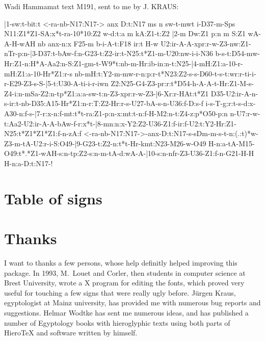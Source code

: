\documentclass[final]{article}
\begin{document}
Wadi Hammamat text M191, sent to me by J. KRAUS:
\begin{hieroglyph}
|1-sw:t-bit:t <-ra-nb-N17:N17-> anx D:t:N17 ms n sw-t-mwt i-D37-m-Sps N11:Z1*Z1-SA:x*t-ra-10*10:Z2 w-d:t:a m
kA:Z1-t:Z2 |2-m Dw:Z1 p:n m S:Z1 wA-A-H-wAH nb anx-n:x F25-m b-i-A-t:F18 ir:t H-w
U2:ir-A-A-xpr:r-w-Z3-nw:Z1-nTr-p:n-|3-D37:t-bAw-f:n-G23-t:Z2-ir:t-N25:t*Z1-m-U20:nw-i-i-N36
b-s-t:D54-mw-Hr:Z1-n:H*A-Aa2:n-S:Z1-gm-t-W9*t:nb-m-Hr:ib-in:n-t:N25-|4-mH:Z1:a-10-r-mH:Z1:a-10-Hr*Z1:r-s
nb-mH:t:Y2-m-mw-r-n:p:r-t*N23:Z2-s-s-D60-t-s-t:wr:r-ti-i-r-E29-Z3-s-S-|5-t:U30-A-ti-i-r-iwn
Z2:N25-G4-Z3-pr:r:t*D54-h-A-A-t-Hr:Z1-M-s-Z4-i:n-mSa-Z2:n-tp*Z1:a:a-sw-t:n-Z3-xpr:r-w-Z3-|6-Xr:r-HAt:t*Z1
D35-U2:ir-A-n-s-ir:t-nb-D35:A15-Hr*Z1:n-r:T:Z2-Hr:r-s-U27-bA-s-n-U36:f-D:\!\!\!\!\!s-f
i-s-T-g:r:t-s-d:x-A30-n:f-s-|7-r:x-n:f-mt:t*t-ra:Z1-p:n-x:mt:t-n:f-H-M2:n-t:Z4-z:p*O50-p:n
n-U7:r-w-t:Aa2-U2:ir-A-A-bAw-f-r:x*t-|8-mn:n:x-Y2:Z2-U36-Z1:f-ir:f-U2:t:Y2-Hr:Z1-N25:t*Z1*Z1*Z1:f-n-zA:f
<-ra-nb-N17:N17->-anx-D:t:N17-s-sDm-m-s-t-n:(.:t)*w-Z3-m-tA-U2:r-i-S:O49-|9-G23-t:Z2-n:t*t-Hr-km\:t:N23-M26-w-O49
H-n:a-tA-M15-O49:t*.*Z1-wAH-s:n-tp:Z2-s:n-m-tA-d:wA-A-|10-s:n-nfr-Z3-U36-Z1:f-n-G21-H-H
H-n:a-D:t:N17-!
\end{hieroglyph}


\section{Table of signs}
\label{sec:signes}


\def\showHvalue#1#2{\hbox to 0.33\textwidth{#1\hfil
    #2\hfil}\linebreak[3]%
  \hskip 0.1mm  plus 1cm minus 1cm}
\EnPetit{\small
\noindent{}
}
\section{Thanks}
I want to thanks a few persons, whose help definitly helped improving
this package.  In 1993, M.~Louet and Corler, then students in computer
science at Brest University, wrote a X program for editing the fonts,
which proved very useful for touching a few signs that were really
ugly before. J\"urgen Kraus, egyptologist at Mainz university, has
provided me with numerous bug reports and suggestions. Helmar Wodtke
has sent me numerous ideas, and has published a number of Egyptology
books with hieroglyphic texts using both parts of Hiero\TeX{} and
software written by himself.

 

\end{document}
